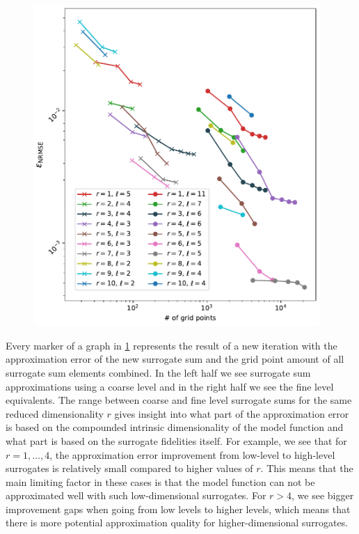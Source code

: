 \documentclass[
  a4paper,  %
  twoside,  %
  bibliography=totoc,
  headsepline,
  cleardoublepage=empty,
  parskip=half,
  draft=false
]{scrbook}
\begin{document}
\begin{mdframed}[style=style]
\begin{figure}[H]
\vspace{-2mm}
\includegraphics[width=0.97\textwidth]{graphics/wingweight_fixed}\vspace{-4mm}
\delimit
{}
\label{fig:wwf}
\end{figure}
\end{mdframed}
%
Every marker of a graph in \cref{fig:wwf} represents the result of a new iteration with the approximation error of the new surrogate sum and the grid point amount of all surrogate sum elements combined.
In the left half we see surrogate sum approximations using a coarse level and in the right half we see the fine level equivalents.
The range between coarse and fine level surrogate sums for the same reduced dimensionality $r$ gives insight into what part of the approximation error is based on the compounded intrinsic dimensionality of the model function and what part is based on the surrogate fidelities itself.
For example, we see that for $r=1, \dots, 4$, the approximation error improvement from low-level to high-level surrogates is relatively small compared to higher values of $r$.
This means that the main limiting factor in these cases is that the model function can not be approximated well with such low-dimensional surrogates.
For $r > 4$, we see bigger improvement gaps when going from low levels to higher levels, which means that there is  more potential approximation quality for higher-dimensional surrogates.
\end{document}
